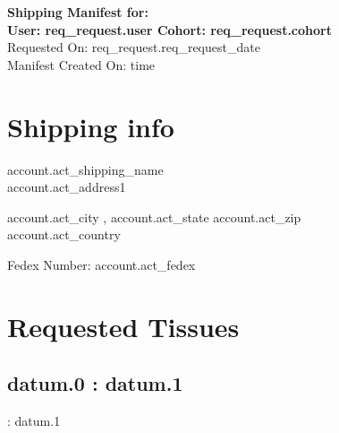 \documentclass{article}[letterpaper]
\begin{document}
\begin{center}
\Large{ \textbf{Shipping Manifest for:\\ User: {{ req_request.user }} Cohort: {{ req_request.cohort }}
 } } \\
\normalsize{Requested On: {{ req_request.req_request_date }} \\
Manifest Created On: {{ time }} }
\end{center}

\section*{Shipping info}

{{ account.act_shipping_name }} \\
{{ account.act_address1 }} \\{%
{{ account.act_city }}, {{ account.act_state }} {{ account.act_zip }} \\
{{ account.act_country }}

\vspace{0.1in}
\noindent Fedex Number: {{ account.act_fedex }}

\section*{Requested Tissues}

{%
  {%
    {%
      \subsection*{ {{ datum.0 }}: {{ datum.1 }} }
    {%
      : {{ datum.1 }}
    {%
  {%

  \vspace{0.05in}
  {%
}}}}}}}}
\end{document}
